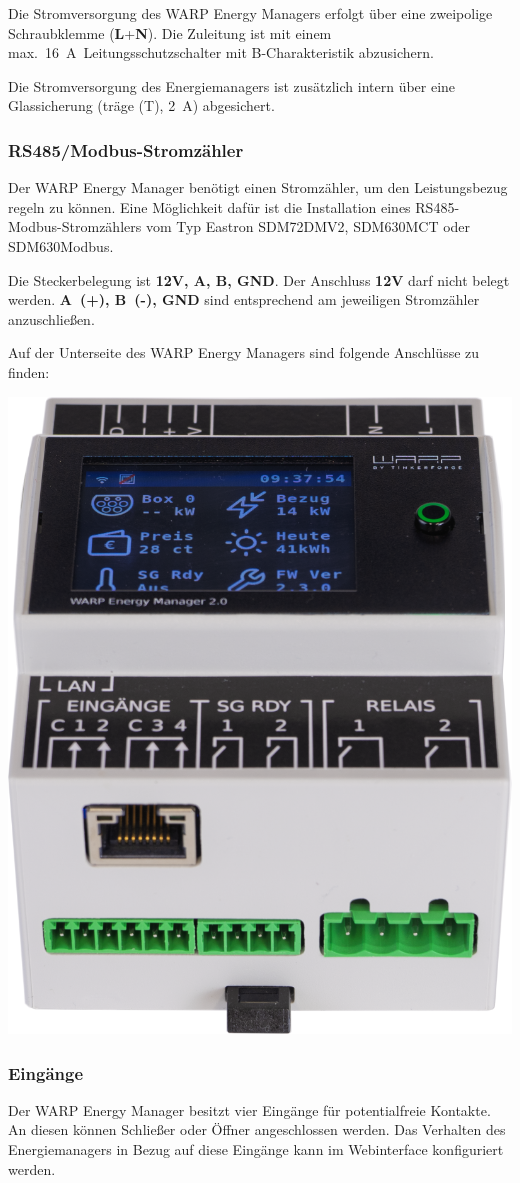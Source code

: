\documentclass[a4paper,10pt]{article}
\begin{document}
\begin{multicols*}{2}
	Die Stromversorgung des WARP Energy Managers erfolgt über eine zweipolige
	Schraubklemme (\textbf{L}+\textbf{N}). Die Zuleitung ist mit einem
	max.~\SI{16}{\ampere}~Leitungsschutzschalter mit B-Charakteristik abzusichern.

	Die Stromversorgung des Energiemanagers ist zusätzlich intern über eine Glassicherung
	(träge (T), \SI{2}{\ampere}) abgesichert.


    \subsubsection{RS485/Modbus-Stromzähler}

	Der WARP Energy Manager benötigt einen Stromzähler, um den Leistungsbezug regeln zu
	können. Eine Möglichkeit dafür ist die Installation eines RS485-Modbus-Stromzählers vom Typ Eastron SDM72DMV2, SDM630MCT oder SDM630Modbus.

	Die Steckerbelegung ist \textbf{12V, A, B, GND}. Der Anschluss \textbf{12V}
	darf nicht belegt werden. \textbf{A~(+), B~(-), GND} sind entsprechend
	am jeweiligen Stromzähler anzuschließen.

    Auf der Unterseite des WARP Energy Managers sind folgende Anschlüsse zu finden:
    \begin{center}
        \includegraphics[width=0.5\linewidth]{./img_v2/wem2-connections-bottom.png}
    \end{center}



    \subsubsection{Eingänge}
	Der WARP Energy Manager besitzt vier Eingänge für potentialfreie Kontakte.
	An diesen können Schließer oder Öffner angeschlossen werden. Das Verhalten des
	Energiemanagers in Bezug auf diese Eingänge kann im Webinterface konfiguriert werden.


\end{multicols*}
\end{document}
